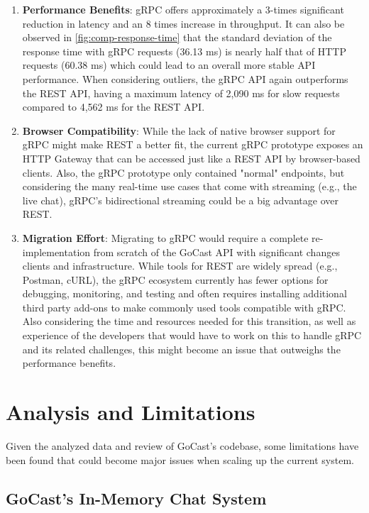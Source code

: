 \begin{enumerate}
    \item \textbf{Performance Benefits}: gRPC offers approximately a 3-times significant reduction in latency and an 8 times increase in throughput. It can also be observed in \autoref{fig:comp-response-time} that the standard deviation of the response time with gRPC requests (36.13 ms) is nearly half that of HTTP requests (60.38 ms) which could lead to an overall more stable \ac{API} performance.  When considering outliers, the gRPC \ac{API} again outperforms the REST \ac{API}, having a maximum latency of 2,090 ms for slow requests compared to 4,562 ms for the REST \ac{API}.

    \item \textbf{Browser Compatibility}: While the lack of native browser support for gRPC might make REST a better fit, the current gRPC prototype exposes an HTTP Gateway that can be accessed just like a REST API by browser-based clients. Also, the gRPC prototype only contained "normal" endpoints, but considering the many real-time use cases that come with streaming (e.g., the live chat), gRPC’s bidirectional streaming could be a big advantage over REST.

    \item \textbf{Migration Effort}: Migrating to gRPC would require a complete re-implementation from scratch of the GoCast \ac{API} with significant changes clients and infrastructure. While tools for REST are widely spread (e.g., Postman, cURL), the gRPC ecosystem currently has fewer options for debugging, monitoring, and testing and often requires installing additional third party add-ons to make commonly used tools compatible with gRPC. Also considering the time and resources needed for this transition, as well as experience of the developers that would have to work on this to handle gRPC and its related challenges, this might become an issue that outweighs the performance benefits.
\end{enumerate}

\section{Analysis and Limitations}

Given the analyzed data and review of GoCast's codebase, some limitations have been found that could become major issues when scaling up the current system.

\subsection{GoCast's In-Memory Chat System}

